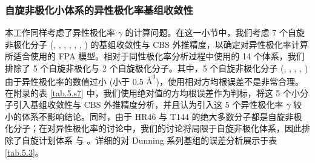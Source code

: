 \subsubsection{自旋非极化小体系的异性极化率基组收敛性}

本工作同样考虑了异性极化率 $\gamma$ 的计算问题。在这一小节中，我们考虑 7 个自旋非极化分子 (, , , , , , ) 的基组收敛性与 CBS 外推精度，以确定对异性极化率计算所适合使用的 FPA 模型。相对于同性极化率分析过程中使用的 14 个体系，我们排除了 5 个自旋非极化与 2 个自旋极化分子。其中，5 个自旋非极化分子 (, , , , ) 由于异性极化率的数值过小 (小于 0.5 $\text{\AA}^3$)，使用相对方均根误差不是非常合理。在附录的表 \ref{tab.5.s7} 中，我们使用绝对值的方均根误差作为判标，将这 5 个小分子引入基组收敛性与 CBS 外推精度分析，并且认为引入这 5 个异性极化率 $\gamma$ 较小的体系不影响结论。同时，由于 HR46 与 T144 的绝大多数分子都是自旋非极化分子；在对异性极化率的讨论中，我们的讨论将局限于自旋非极化体系，因此排除了自旋计划体系  与 。详细的对 Dunning 系列基组的误差分析展示于表 \ref{tab.5.3}。

